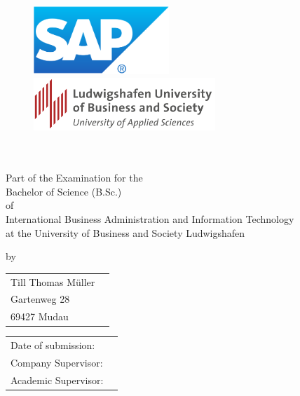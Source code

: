 \thispagestyle{empty}
\begin{titlepage}
\enlargethispage{4cm}

\begin{figure}           %
	\vspace*{-5mm} %
	\begin{minipage}{0.49\textwidth}
		\flushleft
		\includegraphics[height=2.6cm]{Bilder/Logos/Logo_SAP.pdf} 
	\end{minipage}
	\hfill
	\begin{minipage}{0.49\textwidth}
		
		\includegraphics[height=2cm]{Bilder/Logos/Logo_HWGLU.png} 
	\end{minipage}
	\hfill
\end{figure} 
\vspace*{0.1cm}

\begin{center}
	\huge{\textbf{\titel}}\\[1.5cm]
	\Large{\textbf{\arbeit}}\\[1cm]
	\normalsize{Part of the Examination for the \\[0.2cm]Bachelor of Science (B.Sc.)\\[0.2cm] of \\[0.2cm]}
	\normalsize{International Business Administration and Information Technology}\\[0.2cm]
	\normalsize{at the University of Business and Society Ludwigshafen}\\[2cm]
\end{center}

\begin{center}
	\vfill
	\normalsize{by}\\[0.5cm]
	\begin{tabular}{ll}
		Till Thomas Müller	\\[0.2cm]
		Gartenweg 28  		\\[0.2cm]
		69427 Mudau			\\[2cm]
	\end{tabular} 
\end{center}

\begin{center}
	\vfill
	\begin{tabular}{ll}
		Date of submission:		& \abgabe \\[0.2cm]
		Company Supervisor:		& \betreuerFirma \\[0.2cm]
		Academic Supervisor:	& \betreuerHWG \\[2cm]
	\end{tabular} 
\end{center}
\end{titlepage}
